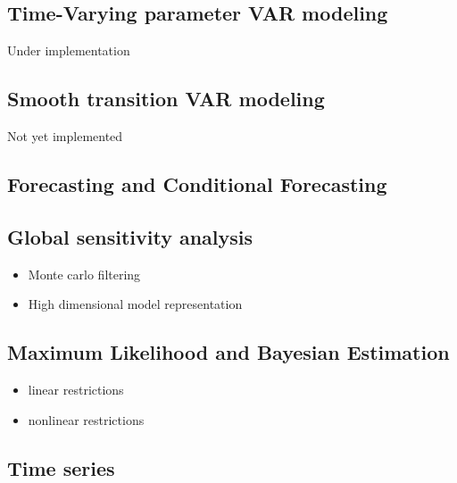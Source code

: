 \documentclass[letterpaper,10pt,english]{sphinxmanual}
\begin{document}
\subsection{Time-Varying parameter VAR modeling}
\label{intro_folder/rise_capabilities:time-varying-parameter-var-modeling}
Under implementation


\subsection{Smooth transition VAR modeling}
\label{intro_folder/rise_capabilities:smooth-transition-var-modeling}
Not yet implemented


\subsection{Forecasting and Conditional Forecasting}
\label{intro_folder/rise_capabilities:forecasting-and-conditional-forecasting}

\subsection{Global sensitivity analysis}
\label{intro_folder/rise_capabilities:global-sensitivity-analysis}\begin{itemize}
\item {} 
Monte carlo filtering

\item {} 
High dimensional model representation

\end{itemize}


\subsection{Maximum Likelihood and Bayesian Estimation}
\label{intro_folder/rise_capabilities:maximum-likelihood-and-bayesian-estimation}\begin{itemize}
\item {} 
linear restrictions

\item {} 
nonlinear restrictions

\end{itemize}


\subsection{Time series}
\label{intro_folder/rise_capabilities:time-series}
\end{document}

